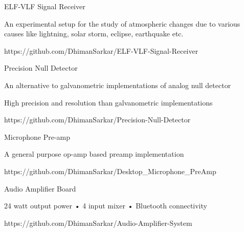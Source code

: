 \begin{cventries}

  \cventry
    {ELF-VLF Signal Receiver} %
    {} %
    {} %
    {} %
    {
      \begin{cvitems} %
        \item {An experimental setup for the study of atmospheric changes due to various causes like lightning, solar storm, eclipse, earthquake etc.}
        \item {https://github.com/DhimanSarkar/ELF-VLF-Signal-Receiver}
      \end{cvitems}
    }

  \cventry
    {Precision Null Detector} %
    {} %
    {} %
    {} %
    {
      \begin{cvitems} %
        \item {An alternative to galvanometric implementations of analog null detector}
        \item{High precision and resolution than galvanometric implementations}
        \item {https://github.com/DhimanSarkar/Precision-Null-Detector}
      \end{cvitems}
    }


  \cventry
    {Microphone Pre-amp} %
    {} %
    {} %
    {} %
    {
      \begin{cvitems} %
        \item {A general purpose op-amp based preamp implementation}
        \item {https://github.com/DhimanSarkar/Desktop\_Microphone\_PreAmp}
      \end{cvitems}
    }



  \cventry
    {Audio Amplifier Board} %
    {} %
    {} %
    {} %
    {
      \begin{cvitems} %
        \item {24 watt output power • 4 input mixer • Bluetooth connectivity}
        \item {https://github.com/DhimanSarkar/Audio-Amplifier-System}
      \end{cvitems}
    }
\end{cventries}
